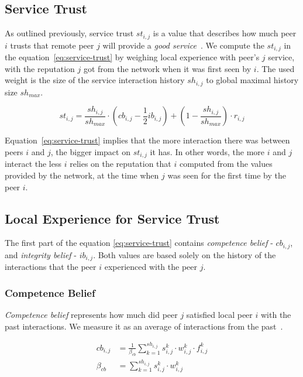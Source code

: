 \subsection{Service Trust}
\label{subsec:service-trust}
As outlined previously, service trust $st_{i, j}$ is a value that describes how much peer $i$ trusts that remote peer $j$ will provide a \textit{good service}~\cite{sort}.
We compute the $st_{i, j}$ in the equation~\ref{eq:service-trust} by weighing local experience with peer's $j$ service, with the reputation $j$ got from the network when it was first seen by $i$.
The used weight is the size of the service interaction history $sh_{i,j}$ to global maximal history size $sh_{max}$.

\begin{equation}
\label{eq:service-trust}
    st_{i,j}=\frac{sh_{i,j}}{sh_{max}} \cdot \left(cb_{i,j} - \frac{1}{2} ib_{i,j} \right) +\left(1-\frac{sh_{i,j}}{sh_{max}}\right) \cdot r_{i,j}
\end{equation}

Equation~\ref{eq:service-trust} implies that the more interaction there was between peers $i$ and $j$, the bigger impact on $st_{i,j}$ it has. 
In other words, the more $i$ and $j$ interact the less $i$ relies on the reputation that $i$ computed from the values provided by the network, at the time when $j$ was seen for the first time by the peer $i$.

\subsection{Local Experience for Service Trust}
The first part of the equation \ref{eq:service-trust} contains \textit{competence belief} - $cb_{i,j}$, and \textit{integrity belief} - $ib_{i,j}$.
Both values are based solely on the history of the interactions that the peer $i$ experienced with the peer $j$.

\subsubsection{Competence Belief}
\textit{Competence belief} represents how much did peer $j$ satisfied local peer $i$ with the past interactions. We measure it as an average of interactions from the past~\cite{sort}.

\begin{equation}
\begin{split}
    cb_{i,j} &= \frac{1}{\beta_{cb}} \sum_{k=1}^{sh_{i, j}} s_{i,j}^{k} \cdot w_{i,j}^{k} \cdot f_{i,j}^{k} \\
    \beta_{cb} &= \sum_{k=1}^{sh_{i, j}} s_{i,j}^{k} \cdot w_{i,j}^{k}
\end{split}
\end{equation}

